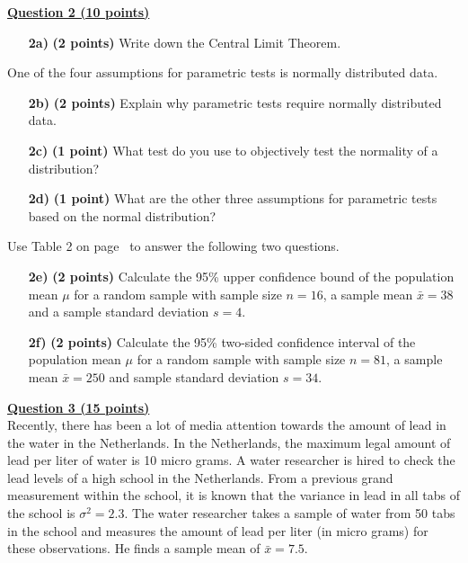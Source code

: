 \underline{\textbf{Question 2 (10 points)}} \\

\begin{itemize}

    \item[\textbf{2a)}] \textbf{(2 points)} Write down the Central Limit Theorem.
    
\end{itemize}
    
    One of the four assumptions for parametric tests is normally distributed data.

\begin{itemize}
    
    \item[\textbf{2b)}] \textbf{(2 points)} Explain why parametric tests require normally distributed data.
    
    \item[\textbf{2c)}] \textbf{(1 point)} What test do you use to objectively test the normality of a distribution? 
    
    \item[\textbf{2d)}] \textbf{(1 point)} What are the other three assumptions for parametric tests based on the normal distribution? 

\end{itemize}
    
    Use Table 2 on page~\pageref{table2} to answer the following two questions.
    
\begin{itemize}
    
    \item[\textbf{2e)}] \textbf{(2 points)} Calculate the 95\% upper confidence bound of the population mean $\mu$ for a random sample with sample size $n = 16$, a sample mean $\bar{x} = 38$ and a sample standard deviation $s = 4$. 
    
    \item[\textbf{2f)}] \textbf{(2 points)} Calculate the 95\% two-sided confidence interval of the population mean $\mu$ for a random sample with sample size $n = 81$, a sample mean $\bar{x} = 250$ and sample standard deviation $s = 34$.

\end{itemize}

\clearpage %

\underline{\textbf{Question 3 (15 points)}} \\

Recently, there has been a lot of media attention towards the amount of lead in the water in the Netherlands. In the Netherlands, the maximum legal amount of lead per liter of water is 10 micro grams. A water researcher is hired to check the lead levels of a high school in the Netherlands. From a previous grand measurement within the school, it is known that the variance in lead in all tabs of the school is $\sigma^2 = 2.3$. The water researcher takes a sample of water from 50 tabs in the school and measures the amount of lead per liter (in micro grams) for these observations. He finds a sample mean of $\bar{x} = 7.5$.  \\

